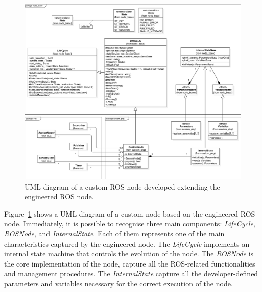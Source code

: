 \begin{figure}[t]
    \centering
    \includegraphics[width=\textwidth]{gfx/uml}
    \caption{UML diagram of a custom ROS node developed extending the engineered ROS node.}\label{fig:node-class}
\end{figure}

Figure~\ref{fig:node-class} shows a UML diagram of a custom node based on the engineered ROS node. Immediately, it is possible to recognise three main components: \textit{LifeCycle}, \textit{ROSNode}, and \textit{InternalState}. Each of them represents one of the main characteristics captured by the engineered node. The \textit{LifeCycle} implements an internal state machine that controls the evolution of the node. The \textit{ROSNode} is the core implementation of the node, capture all the ROS-related functionalities and management procedures. The \textit{InternalState} capture all the developer-defined parameters and variables necessary for the correct execution of the node.

